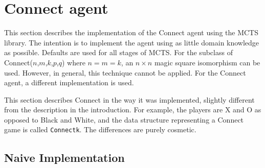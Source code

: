 \section{Connect agent}
This section describes the implementation of the {Connect} agent using the {MCTS} library. The intention is to implement the agent using as little domain knowledge as possible. Defaults are used for all stages of {MCTS}. For the subclass of {Connect}($n$,$m$,$k$,$p$,$q$) where $n=m=k$, an $n\times n$ magic square isomorphism can be used. However, in general, this technique cannot be applied. For the {Connect} agent, a different implementation is used.

This section describes {Connect} in the way it was implemented, slightly different from the description in the introduction. For example, the players are X and O as opposed to Black and White, and the data structure representing a {Connect} game is called \texttt{Connectk}. The differences are purely cosmetic.

\subsection{Naive Implementation}
